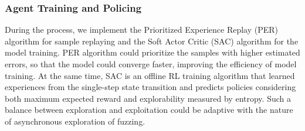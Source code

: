 \documentclass[lettersize,journal]{IEEEtran}
\begin{document}
\subsubsection{Agent Training and Policing}

During the process, we implement the Prioritized Experience Replay (PER) \cite{schaulPrioritizedExperienceReplay2016} algorithm for sample replaying and the Soft Actor Critic (SAC) \cite{haarnojaSoftActorcriticOffpolicy2018} algorithm for the model training. PER algorithm could prioritize the samples with higher estimated errors, so that the model could converge faster, improving the efficiency of model training. At the same time, SAC is an offline RL training algorithm that learned experiences from the single-step state transition and predicts policies considering both maximum expected reward and explorability measured by entropy. Such a balance between exploration and exploitation could be adaptive with the nature of asynchronous exploration of fuzzing.
\end{document}
